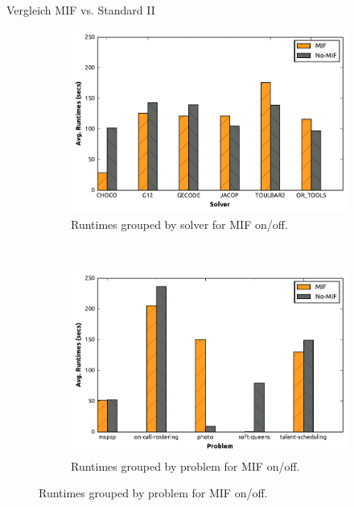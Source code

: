 \begin{frame}{Vergleich MIF vs. Standard II}
\begin{figure}
	\centering
	\begin{subfigure}[b]{.48\textwidth}
		\centering
		\includegraphics[width=\textwidth]{img/runtime-mif-solver.pdf} %
         \caption{Runtimes grouped by solver for MIF on/off.}
		\label{fig:runtimesMIFSolvers}
	\end{subfigure}%
	~ \quad%
	\begin{subfigure}[b]{.48\textwidth}
		\centering
		\includegraphics[width=\textwidth]{img/runtime-mif-problem.pdf}
		\caption{Runtimes grouped by problem for MIF on/off.}
		\label{fig:runtimesMIFProblems}
	\end{subfigure}

	\label{fig:runtimesMIF}
\end{figure}
\end{frame}